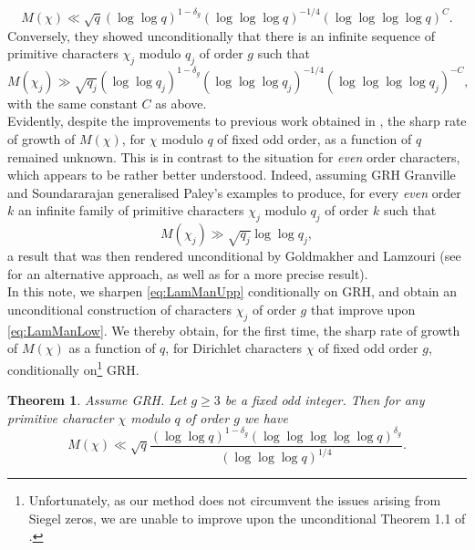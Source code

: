 \documentclass[10pt]{amsart}
\newtheorem{thm}{Theorem}[section]
\theoremstyle{definition}
\begin{document}
\begin{equation}\label{eq:LamManUpp}
M(\chi) \ll \sqrt{q}(\log\log q)^{1-\delta_g}(\log\log\log q)^{-1/4} (\log\log\log\log q)^C.
\end{equation}
Conversely, they showed unconditionally that there is an infinite sequence of primitive characters $\chi_j$ modulo $q_j$ of order $g$ such that
\begin{equation}\label{eq:LamManLow}
M(\chi_j) \gg \sqrt{q_j}(\log\log q_j)^{1-\delta_g}(\log\log\log q_j)^{-1/4} (\log\log\log\log q_j)^{-C},
\end{equation}
with the same constant $C$ as above. \\
Evidently, despite the improvements to previous work obtained in \cite{LamMan}, the sharp rate of growth of $M(\chi)$, for $\chi$ modulo $q$ of fixed odd order, as a function of $q$ remained unknown. This is in contrast to the situation for \emph{even} order characters, which appears to be rather better understood. Indeed, assuming GRH Granville and Soundararajan \cite{GSPret} generalised Paley's examples to produce, for every \emph{even} order $k$ an infinite family of primitive characters $\chi_j$ modulo $q_j$ of order $k$ such that 
$$
M(\chi_j) \gg \sqrt{q_j}\log\log q_j,
$$
a result that was then rendered unconditional by Goldmakher and Lamzouri \cite{LamGold} (see  \cite{Bob} for an alternative approach, as well as \cite{Lamk} for a more precise result). \\
In this note, we sharpen \eqref{eq:LamManUpp} conditionally on GRH, and obtain an unconditional construction of characters $\chi_j$ of order $g$ that improve upon \eqref{eq:LamManLow}.
We thereby obtain, for the first time, the sharp rate of growth of $M(\chi)$ as a function of $q$, for Dirichlet characters $\chi$ of fixed odd order $g$, conditionally on\footnote{Unfortunately, as our method does not circumvent the issues arising from Siegel zeros, we are unable to improve upon the unconditional Theorem 1.1 of \cite{LamMan}.} GRH.
\begin{thm}\label{thm:oddOrdMag}
Assume GRH. Let $g\geq 3$ be a fixed odd integer. Then for any primitive character $\chi$ modulo $q$ of order $g$ we have
$$
M(\chi) \ll \sqrt{q}\frac{(\log\log q)^{1-\delta_g} (\log\log\log\log\log q)^{\delta_g}}{(\log\log\log q)^{1/4}}.
$$
\end{thm}
\end{document}
